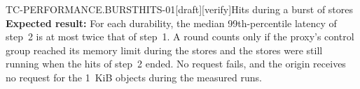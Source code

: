 \begin{requirement}{TC-PERFORMANCE.BURSTHITS-01}[draft][verify]{Hits during a burst of stores}
  \textbf{Expected result:} For each durability, the median 99th-percentile
  latency of step~2 is at most twice that of step~1. A round counts only if
  the proxy's control group reached its memory limit during the stores and
  the stores were still running when the hits of step~2 ended. No request
  fails, and the origin receives no request for the 1~KiB objects during
  the measured runs.



\end{requirement}

